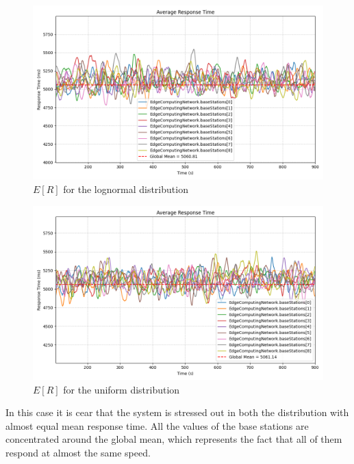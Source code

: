 \documentclass{report}
\begin{document}
\begin{figure}[H]
    \centering
    \includegraphics[width=\textwidth]{img/plots/log_1e4_B/resptime.png}
    \caption{$E[R]$ for the lognormal distribution}
\end{figure}

\begin{figure}[H]
    \centering
    \includegraphics[width=\textwidth]{img/plots/uni_1e4_B/resptime.png}
    \caption{$E[R]$ for the uniform distribution}
\end{figure}

In this case it is cear that the system is stressed out in both the distribution with almost equal mean response time. All the values of the base stations are concentrated around the global mean, which represents the fact that all of them respond at almost the same speed.
\end{document}
